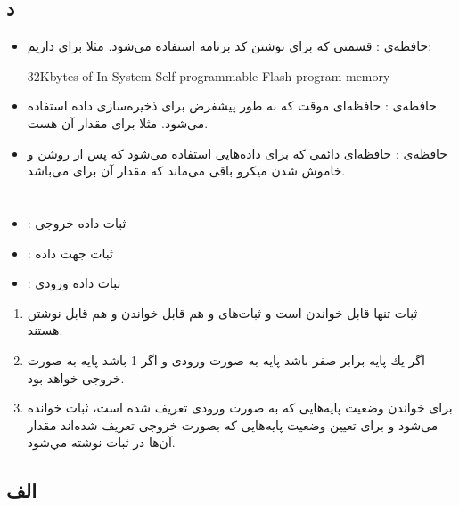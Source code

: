 \documentclass{article}
\begin{document}
\subsection{د}
\begin{itemize}
	\item حافظه‌ی : قسمتی که برای نوشتن کد برنامه استفاده می‌شود. مثلا برای  داریم:
\begin{latin}
32Kbytes of In-System Self-programmable Flash program memory
\end{latin}


	\item حافظه‌ی : حافظه‌ای موقت که به طور پیشفرض برای ذخیره‌سازی داده استفاده می‌شود. مثلا برای  مقدار آن  هست.

	\item حافظه‌ی : حافظه‌ای دائمی که برای داده‌هایی استفاده می‌شود که پس
از روشن و خاموش شدن میکرو باقی می‌ماند که مقدار آن برای   می‌باشد.
\end{itemize}



\section{}

\begin{itemize}
    \item {}: ثبات داده خروجی 
    \item {}: ثبات جهت داده 
    \item {}: ثبات داده ورودی 
\end{itemize}

\begin{enumerate}
    \item ثبات  تنها قابل خواندن است و ثبات‌های  و  هم قابل خواندن و هم قابل نوشتن هستند.
    \item اگر  یك پایه برابر صفر باشد پایه به صورت ورودی و اگر  1 باشد پایه به صورت خروجی خواهد بود.
    \item برای خواندن وضعیت پایه‌هایی که به صورت ورودی تعریف شده است، ثبات  خوانده می‌شود و برای تعیین وضعیت پایه‌هایی که بصورت خروجی تعریف شده‌اند مقدار آن‌ها در ثبات  نوشته مي‌شود.
\end{enumerate}

\subsection{الف}
\lr{}
\end{document}

